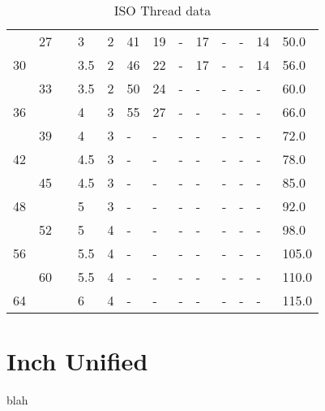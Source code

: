 \begin{table}[h!]
\begin{longtable}{lll|ll|lllllll|l}
        &27  &    &3       &2          &41        &19     &-      &17     &-           &-         &14   &50.0  \\
    30  &    &    &3.5     &2          &46        &22     &-      &17     &-           &-         &14   &56.0  \\
        &33  &    &3.5     &2          &50        &24     &-      &-      &-           &-         &-    &60.0  \\
    36  &    &    &4       &3          &55        &27     &-      &-      &-           &-         &-    &66.0  \\
        &39  &    &4       &3          &-         &-      &-      &-      &-           &-         &-    &72.0  \\
    42  &    &    &4.5     &3          &-         &-      &-      &-      &-           &-         &-    &78.0  \\
        &45  &    &4.5     &3          &-         &-      &-      &-      &-           &-         &-    &85.0  \\
    48  &    &    &5       &3          &-         &-      &-      &-      &-           &-         &-    &92.0  \\
        &52  &    &5       &4          &-         &-      &-      &-      &-           &-         &-    &98.0  \\
    56  &    &    &5.5     &4          &-         &-      &-      &-      &-           &-         &-    &105.0 \\
        &60  &    &5.5     &4          &-         &-      &-      &-      &-           &-         &-    &110.0 \\
    64  &    &    &6       &4          &-         &-      &-      &-      &-           &-         &-    &115.0 \\
\end{longtable}
\caption{ISO Thread data}
\end{table}
\clearpage


\clearpage
\section{Inch Unified}
blah
\\ \\ \\ \\ \\ \\ \\ \\ \\ \\ \\ \\ \\ \\ \\ \\ \\ \\               

